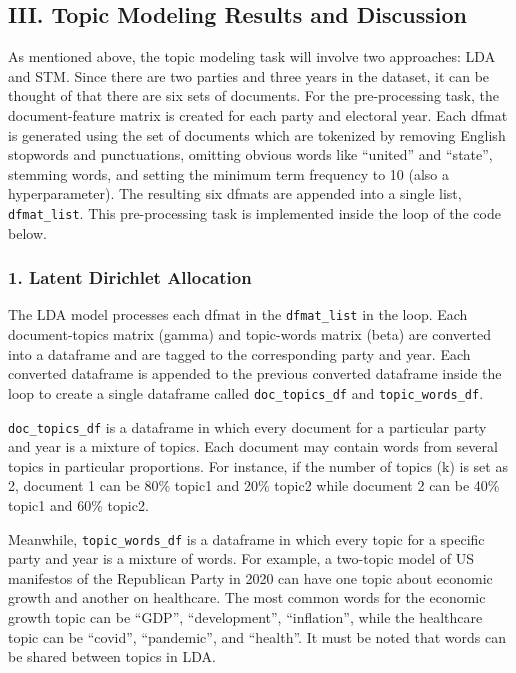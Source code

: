 \documentclass[
]{article}
\begin{document}
\hypertarget{iii.-topic-modeling-results-and-discussion}{%
\subsection{III. Topic Modeling Results and
Discussion}\label{iii.-topic-modeling-results-and-discussion}}

As mentioned above, the topic modeling task will involve two approaches:
LDA and STM. Since there are two parties and three years in the dataset,
it can be thought of that there are six sets of documents. For the
pre-processing task, the document-feature matrix is created for each
party and electoral year. Each dfmat is generated using the set of
documents which are tokenized by removing English stopwords and
punctuations, omitting obvious words like ``united'' and ``state'',
stemming words, and setting the minimum term frequency to 10 (also a
hyperparameter). The resulting six dfmats are appended into a single
list, \texttt{dfmat\_list}. This pre-processing task is implemented
inside the loop of the code below.

\hypertarget{latent-dirichlet-allocation}{%
\subsubsection{1. Latent Dirichlet
Allocation}\label{latent-dirichlet-allocation}}

The LDA model processes each dfmat in the \texttt{dfmat\_list} in the
loop. Each document-topics matrix (gamma) and topic-words matrix (beta)
are converted into a dataframe and are tagged to the corresponding party
and year. Each converted dataframe is appended to the previous converted
dataframe inside the loop to create a single dataframe called
\texttt{doc\_topics\_df} and \texttt{topic\_words\_df}.

\texttt{doc\_topics\_df} is a dataframe in which every document for a
particular party and year is a mixture of topics. Each document may
contain words from several topics in particular proportions. For
instance, if the number of topics (k) is set as 2, document 1 can be
80\% topic1 and 20\% topic2 while document 2 can be 40\% topic1 and 60\%
topic2.

Meanwhile, \texttt{topic\_words\_df} is a dataframe in which every topic
for a specific party and year is a mixture of words. For example, a
two-topic model of US manifestos of the Republican Party in 2020 can
have one topic about economic growth and another on healthcare. The most
common words for the economic growth topic can be ``GDP'',
``development'', ``inflation'', while the healthcare topic can be
``covid'', ``pandemic'', and ``health''. It must be noted that words can
be shared between topics in LDA.
\end{document}
